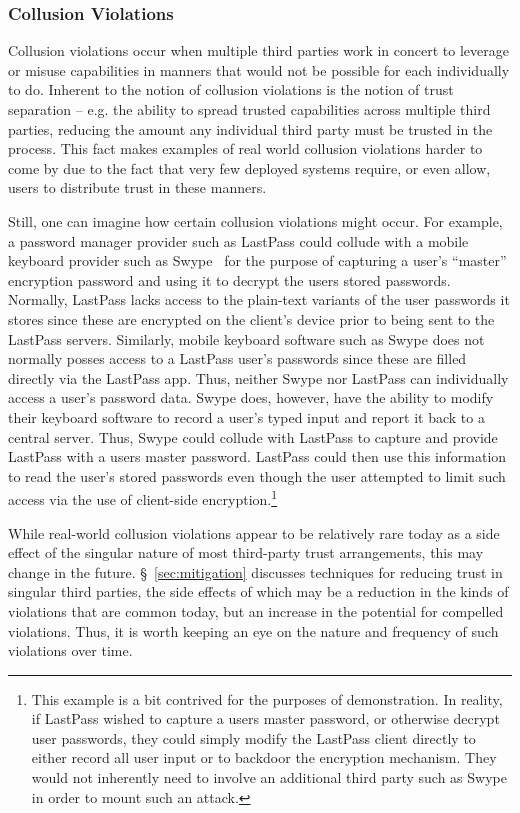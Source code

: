 \subsubsection{Collusion Violations}

Collusion violations occur when multiple third parties work in concert
to leverage or misuse capabilities in manners that would not be
possible for each individually to do. Inherent to the notion of
collusion violations is the notion of trust separation -- e.g. the
ability to spread trusted capabilities across multiple third parties,
reducing the amount any individual third party must be trusted in the
process. This fact makes examples of real world collusion violations
harder to come by due to the fact that very few deployed systems
require, or even allow, users to distribute trust in these manners.

Still, one can imagine how certain collusion violations might
occur. For example, a password manager provider such as LastPass could
collude with a mobile keyboard provider such as Swype~\cite{swype} for
the purpose of capturing a user's ``master'' encryption password and
using it to decrypt the users stored passwords. Normally, LastPass
lacks access to the plain-text variants of the user passwords it
stores since these are encrypted on the client's device prior to being
sent to the LastPass servers. Similarly, mobile keyboard software such
as Swype does not normally posses access to a LastPass user's
passwords since these are filled directly via the LastPass app. Thus,
neither Swype nor LastPass can individually access a user's password
data. Swype does, however, have the ability to modify their keyboard
software to record a user's typed input and report it back to a
central server. Thus, Swype could collude with LastPass to capture and
provide LastPass with a users master password. LastPass could then use
this information to read the user's stored passwords even though the
user attempted to limit such access via the use of client-side
encryption.\footnote{This example is a bit contrived for the purposes
  of demonstration. In reality, if LastPass wished to capture a users
  master password, or otherwise decrypt user passwords, they could
  simply modify the LastPass client directly to either record all user
  input or to backdoor the encryption mechanism. They would not
  inherently need to involve an additional third party such as Swype
  in order to mount such an attack.}

While real-world collusion violations appear to be relatively rare
today as a side effect of the singular nature of most third-party
trust arrangements, this may change in the
future. \S~\ref{sec:mitigation} discusses techniques for reducing
trust in singular third parties, the side effects of which may be a
reduction in the kinds of violations that are common today, but an
increase in the potential for compelled violations. Thus, it is worth
keeping an eye on the nature and frequency of such violations over
time.


